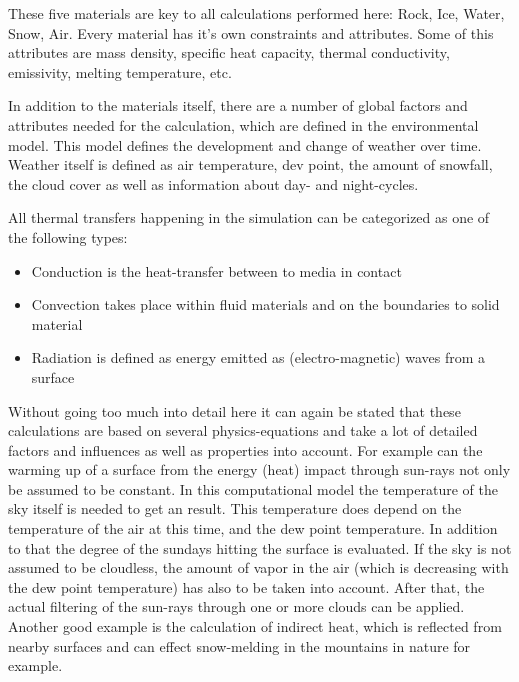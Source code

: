These five materials are key to all calculations performed here: Rock, Ice, Water, Snow, Air. Every material has it's own constraints and attributes. Some of this attributes are mass density, specific heat capacity, thermal conductivity, emissivity, melting temperature, etc.

In addition to the materials itself, there are a number of global factors and attributes needed for the calculation, which are defined in the environmental model. This model defines the development and change of weather over time. Weather itself is defined as air temperature, dev point, the amount of snowfall, the cloud cover as well as information about day- and night-cycles.

All thermal transfers happening in the simulation can be categorized as one of the following types:
\begin{itemize}
	\item Conduction is the heat-transfer between to media in contact
	\item Convection takes place within fluid materials and on the boundaries to solid material
	\item Radiation is defined as energy emitted as (electro-magnetic) waves from a surface
\end{itemize}

Without going too much into detail here it can again be stated that these calculations are based on several physics-equations and take a lot of detailed factors and influences as well as properties into account. For example can the warming up of a surface from the energy (heat) impact through sun-rays not only be assumed to be constant. In this computational model the temperature of the sky itself is needed to get an result. This temperature does depend on the temperature of the air at this time, and the dew point temperature. In addition to that the degree of the sundays hitting the surface is evaluated. If the sky is not assumed to be cloudless, the amount of vapor in the air (which is decreasing with the dew point temperature) has also to be taken into account. After that, the actual filtering of the sun-rays through one or more clouds can be applied. Another good example is the calculation of indirect heat, which is reflected from nearby surfaces and can effect snow-melding in the mountains in nature for example.

